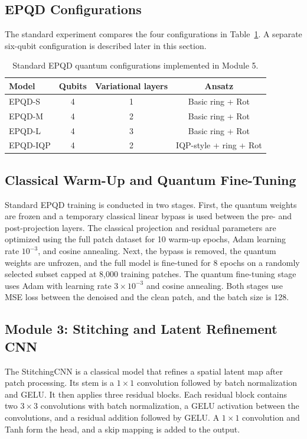 \subsection{EPQD Configurations}
The standard experiment compares the four configurations in Table~\ref{tab:configs}. A separate six-qubit configuration is described later in this section.
\begin{table}[t]
\centering
\caption{Standard EPQD quantum configurations implemented in Module 5.}
\label{tab:configs}
\begin{tabular}{lccc}
\toprule
\textbf{Model} & \textbf{Qubits} & \textbf{Variational layers} & \textbf{Ansatz}\\
\midrule
EPQD-S & 4 & 1 & Basic ring + Rot\\
EPQD-M & 4 & 2 & Basic ring + Rot\\
EPQD-L & 4 & 3 & Basic ring + Rot\\
EPQD-IQP & 4 & 2 & IQP-style + ring + Rot\\
\bottomrule
\end{tabular}
\end{table}

\subsection{Classical Warm-Up and Quantum Fine-Tuning}
Standard EPQD training is conducted in two stages. First, the quantum weights are frozen and a temporary classical linear bypass is used between the pre- and post-projection layers. The classical projection and residual parameters are optimized using the full patch dataset for 10 warm-up epochs, Adam learning rate $10^{-3}$, and cosine annealing. Next, the bypass is removed, the quantum weights are unfrozen, and the full model is fine-tuned for 8 epochs on a randomly selected subset capped at 8{,}000 training patches. The quantum fine-tuning stage uses Adam with learning rate $3\times10^{-3}$ and cosine annealing. Both stages use MSE loss between the denoised and the clean patch, and the batch size is 128.

\subsection{Module 3: Stitching and Latent Refinement CNN}
The StitchingCNN is a classical model that refines a spatial latent map after patch processing. Its stem is a $1\times1$ convolution followed by batch normalization and GELU. It then applies three residual blocks. Each residual block contains two $3\times3$ convolutions with batch normalization, a GELU activation between the convolutions, and a residual addition followed by GELU. A $1\times1$ convolution and Tanh form the head, and a skip mapping is added to the output.

